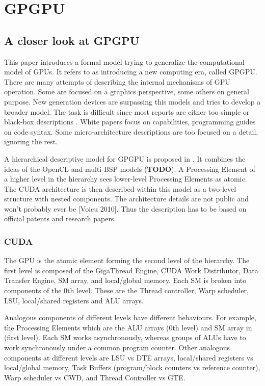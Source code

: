 
\section{GPGPU}

\subsection{A closer look at GPGPU\cite{Hu:2016:CLG:2891449.2873053}}

This paper introduces a formal model trying to generalize the computational model of GPUs.
It refers to \cite{nickolls2010gpu} as introducing a new computing era, called GPGPU.
There are many attempts of describing the internal mechanisms of GPU operation.
Some are focused on a graphics perspective, some others on general purpose.
New generation devices are surpassing this models and \cite{Hu:2016:CLG:2891449.2873053} tries to develop a broader model.
The task is difficult since most reports are either too simple or black-box descriptions \cite{Hu:2016:CLG:2891449.2873053}.
White papers focus on capabilities, programming guides on code syntax.
Some micro-architecture descriptions are too focused on a detail, ignoring the rest.

A hierarchical descriptive model for GPGPU is proposed in \cite{Hu:2016:CLG:2891449.2873053}.
It combines the ideas of the OpenCL and multi-BSP models (\textbf{TODO}).
A Processing Element of a higher level in the hierarchy sees lower-level Processing Elements as atomic.
The CUDA architecture is then described within this model as a two-level structure with nested components.
The architecture details are not public and won't probably ever be [Voicu 2010].
Thus the description has to be based on official patents and research papers.

\subsubsection{CUDA}
The GPU is the atomic element forming the second level of the hierarchy.
The first level is composed of the GigaThread Engine, CUDA Work Distributor, Data Transfer Engine, SM array, and local/global memory.
Each SM is broken into components of the 0th level.
These are the Thread controller, Warp scheduler, LSU, local/shared registers and ALU arrays.

Analogous components of different levels have different behaviours.
For example, the Processing Elements which are the ALU arrays (0th level) and SM array in (first level).
Each SM works asynchronously, whereas groups of ALUs have to work synchronously under a common program counter.
Other analogous components at different levels are LSU vs DTE arrays, local/shared registers vs local/global memory,
Task Buffers (program/block counters vs reference counter), Warp scheduler vs CWD, and Thread Controller vs GTE.

